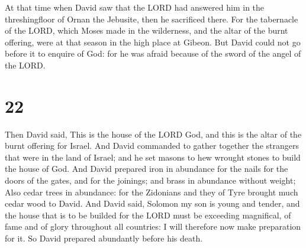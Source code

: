  At that time when David saw that the LORD had answered him
in the threshingfloor of Ornan the Jebusite, then he sacrificed there.
 For the tabernacle of the LORD, which Moses made in the
wilderness, and the altar of the burnt offering, were at that season in
the high place at Gibeon.  But David could not go before it
to enquire of God: for he was afraid because of the sword of the angel
of the LORD.

\hypertarget{section-21}{%
\section{22}\label{section-21}}

 Then David said, This is the house of the LORD God, and
this is the altar of the burnt offering for Israel.  And
David commanded to gather together the strangers that were in the land
of Israel; and he set masons to hew wrought stones to build the house of
God.  And David prepared iron in abundance for the nails for
the doors of the gates, and for the joinings; and brass in abundance
without weight;  Also cedar trees in abundance: for the
Zidonians and they of Tyre brought much cedar wood to David.
 And David said, Solomon my son is young and tender, and the
house that is to be builded for the LORD must be exceeding magnifical,
of fame and of glory throughout all countries: I will therefore now make
preparation for it. So David prepared abundantly before his death.

